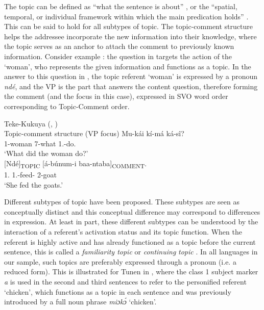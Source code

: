 \documentclass[output=paper]{langscibook}
\begin{document}
The topic can be defined as “what the sentence is about” \citep{Reinhart1981}, or the “spatial, temporal, or individual framework within which the main predication holds” \citep[50]{Chafe1976}. This can be said to hold for all subtypes of topic. The topic-comment structure helps the addressee incorporate the new information into their knowledge, where the topic serves as an anchor to attach the comment to previously known information. Consider example : the question in  targets the action of the ‘woman’, who represents the given information and functions as a topic. In the answer  to this question in , the topic referent ‘woman’ is expressed by a pronoun \textit{ndé}, and the VP is the part that answers the content question, therefore forming the comment (and the focus in this case), expressed in SVO word order corresponding to Topic-Comment order.

\ea
Teke-Kukuya (, \cite{chapters/teke})\\
\label{ex:teke:tcs}Topic-comment structure (VP focus)
\ea
\label{ex:teke:tcs:q}
\gll
Mu-kái  kí-má  ká-sî?\\
1-woman  7-what  1\SM.\PST{}-do.\PST{}\\
\glt
‘What did the woman do?’\\

\ex
\label{ex:teke:tcs:a}
\gll
{}[Ndé]\textsubscript{TOPIC} [á-búnum-i  baa-ntaba]\textsubscript{COMMENT}.\\
{\db}1.\PRO{}   {\db}1\SM.\PST{}-feed-\PST{}  2-goat  \\
\glt
‘She fed the goats.’\\


\z
\z


Different subtypes of topic have been proposed. These subtypes are seen as conceptually distinct and this conceptual difference may correspond to differences in expression. At least in part, these different subtypes can be understood by the interaction of a referent’s activation status and its topic function. When the referent is highly active and has already functioned as a topic before the current sentence, this is called a \textit{familiarity topic} or \textit{continuing} \textit{topic} \citep[e.g.][]{FrascarelliHinterhölzl2007,Givón1983,Reinhart1981}. In all languages in our sample, such topics are preferably expressed through a pronoun (i.e. a reduced form). This is illustrated for Tunen in , where the class 1 subject marker \textit{a} is used in the second and third sentences to refer to the personified referent ‘chicken’, which functions as a topic in each sentence and was previously introduced by a full noun phrase \textit{miɔkɔ́} ‘chicken’.
\end{document}
